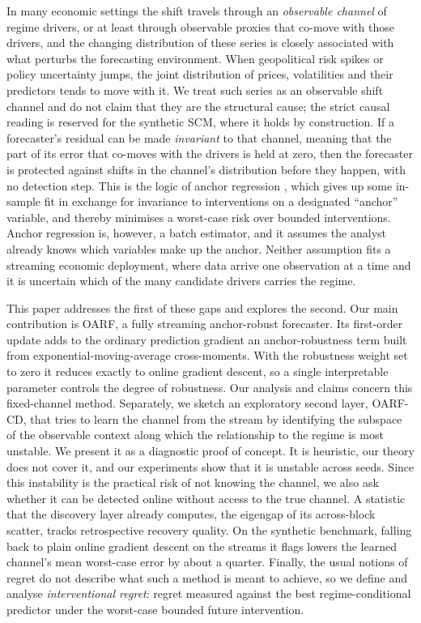 \documentclass[authoryear,preprint,12pt]{elsarticle}
\theoremstyle{plain}
\theoremstyle{remark}
\newcommand{\OARF}{\textsc{OARF}}
\newcommand{\OARFCD}{\textsc{OARF-CD}}
\begin{document}
In many economic settings the shift travels through an \emph{observable channel}
of regime drivers, or at least through observable proxies that co-move with those
drivers, and the changing distribution of these series is closely associated with
what perturbs the forecasting environment. When geopolitical risk spikes or policy
uncertainty jumps, the joint distribution of prices, volatilities and their
predictors tends to move with it. We treat such series as an observable shift
channel and do not claim that they are the structural cause; the strict causal
reading is reserved for the synthetic SCM, where it holds by construction. If a
forecaster's residual can be made \emph{invariant} to that channel, meaning that
the part of its error that co-moves with the drivers is held at zero, then the
forecaster is protected against shifts in the channel's distribution before they
happen, with no detection step. This is the logic of anchor regression
\citep{rothenhausler2021anchor}, which gives up some in-sample fit in exchange for
invariance to interventions on a designated ``anchor'' variable, and thereby
minimises a worst-case risk over bounded interventions. Anchor regression is,
however, a batch estimator, and it assumes the analyst already knows which
variables make up the anchor. Neither assumption fits a streaming economic
deployment, where data arrive one observation at a time and it is uncertain
which of the many candidate drivers carries the regime.

This paper addresses the first of these gaps and explores the second. Our main
contribution is \OARF{}, a fully streaming anchor-robust forecaster. Its
first-order update adds to the ordinary prediction gradient an anchor-robustness
term built from exponential-moving-average cross-moments. With the robustness
weight set to zero it reduces exactly to online gradient descent, so a single
interpretable parameter controls the degree of robustness. Our analysis and
claims concern this fixed-channel method. Separately, we sketch an exploratory
second layer, \OARFCD{}, that tries to learn the channel from the stream by
identifying the subspace of the observable context along which the relationship
to the regime is most unstable. We present it as a diagnostic proof of concept. It
is heuristic, our theory does not cover it, and our experiments show that it is
unstable across seeds. Since this instability is the practical risk of not knowing
the channel, we also ask whether it can be detected online without access to the
true channel. A statistic that the discovery layer already computes, the eigengap
of its across-block scatter, tracks retrospective recovery quality. On the
synthetic benchmark, falling back to plain online gradient descent on the streams
it flags lowers the learned channel's mean worst-case error by about a quarter.
Finally, the usual notions of regret do not describe what such a
method is meant to achieve, so we define and analyse \emph{interventional regret}:
regret measured against the best regime-conditional predictor under the worst-case
bounded future intervention.
\end{document}
